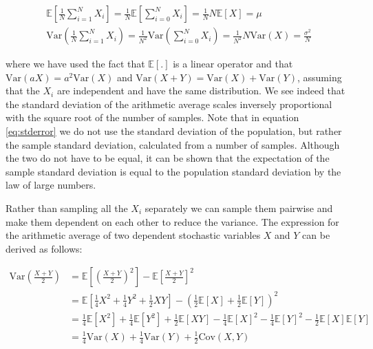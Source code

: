 \documentclass[11pt,a4paper]{article}
\begin{document}
\begin{align}
  \mathbb{E}\left[\frac{1}{N}\sum_{i=1}^N X_i\right] = \frac{1}{N}\mathbb{E}\left[\sum_{i=0}^N X_i\right] = \frac{1}{N}N\mathbb{E}\left[X\right] = \mu \nonumber \\
  \text{Var}\left(\frac{1}{N}\sum_{i=1}^N X_i\right) = \frac{1}{N^2}\text{Var}\left(\sum_{i=0}^N X_i\right) = \frac{1}{N^2}N\text{Var}(X) = \frac{\sigma^2}{N}
\end{align}

where we have used the fact that $\mathbb{E}[.]$ is a linear operator and that $\text{Var}(aX) = a^2\text{Var}(X)$ and $\text{Var}(X + Y) = \text{Var}(X) + \text{Var}(Y)$, assuming that the $X_i$ are independent and have the same distribution. We see indeed that the standard deviation of the arithmetic average scales inversely proportional with the square root of the number of samples. Note that in equation \ref{eq:stderror} we do not use the standard deviation of the population, but rather the sample standard deviation, calculated from a number of samples. Although the two do not have to be equal, it can be shown that the expectation of the sample standard deviation is equal to the population standard deviation by the law of large numbers.

Rather than sampling all the $X_i$ separately we can sample them pairwise and make them dependent on each other to reduce the variance. The expression for the arithmetic average of two dependent stochastic variables $X$ and $Y$ can be derived as follows:

\begin{align}
  \label{eq:cov}
  \text{Var}\left(\frac{X+Y}{2}\right) &= \mathbb{E}\left[\left(\frac{X+Y}{2}\right)^2\right] - \mathbb{E}\left[\frac{X+Y}{2}\right]^2 \nonumber \\
  &= \mathbb{E}\left[\frac{1}{4}X^2 + \frac{1}{4}Y^2 + \frac{1}{2}XY\right] - \left(\frac{1}{2}\mathbb{E}\left[X\right] + \frac{1}{2}\mathbb{E}\left[Y\right]\right)^2 \nonumber \\
  &= \frac{1}{4}\mathbb{E}\left[X^2\right] + \frac{1}{4}\mathbb{E}\left[Y^2\right] + \frac{1}{2}\mathbb{E}\left[XY\right] - \frac{1}{4}\mathbb{E}\left[X\right]^2 - \frac{1}{4}\mathbb{E}\left[Y\right]^2 - \frac{1}{2}\mathbb{E}\left[X\right]\mathbb{E}\left[Y\right] \nonumber \\
  &= \frac{1}{4}\text{Var}\left(X\right) + \frac{1}{4}\text{Var}\left(Y\right) + \frac{1}{2}\text{Cov}\left(X,Y\right)
\end{align}
\end{document}
